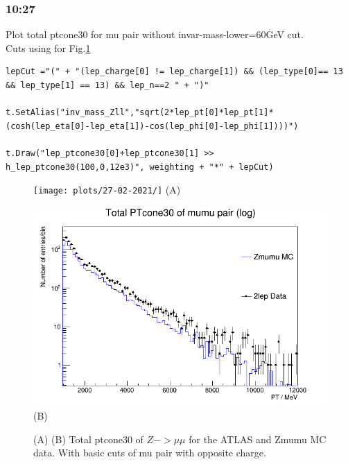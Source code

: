 \subsubsection*{10:27}
Plot total ptcone30 for mu pair without invar-mass-lower=60GeV cut.
\\
Cuts using for Fig.\ref{fig:stack-Zmumu-fast_(basics_mu-pair_opp-c)_27-02-21_10-27}
\begin{lstlisting}
lepCut ="(" + "(lep_charge[0] != lep_charge[1]) && (lep_type[0]== 13 && lep_type[1] == 13) && lep_n==2 " + ")"
    
t.SetAlias("inv_mass_Zll","sqrt(2*lep_pt[0]*lep_pt[1]*(cosh(lep_eta[0]-lep_eta[1])-cos(lep_phi[0]-lep_phi[1])))")

t.Draw("lep_ptcone30[0]+lep_ptcone30[1] >> h_lep_ptcone30(100,0,12e3)", weighting + "*" + lepCut)
\end{lstlisting}

\begin{figure}[h!]
    \centering
    \begin{minipage}{0.5\textwidth}
        \centering
        \texttt{[image: plots/27-02-2021/]}
        (A)
    \end{minipage}\hfill
    \begin{minipage}{0.5\textwidth}
        \centering
        \includegraphics[width=\linewidth]{plots/27-02-2021/2-stack-Zmumu-fast_(basics_mu-pair_opp-c)_27-02-21_10-27.png}
        (B)
    \end{minipage}
    \caption{(A)  (B) Total ptcone30 of $Z -> \mu\mu$ for the ATLAS and Zmumu MC data. With basic cuts of mu pair with opposite charge.}
    \label{fig:stack-Zmumu-fast_(basics_mu-pair_opp-c)_27-02-21_10-27}
\end{figure}


